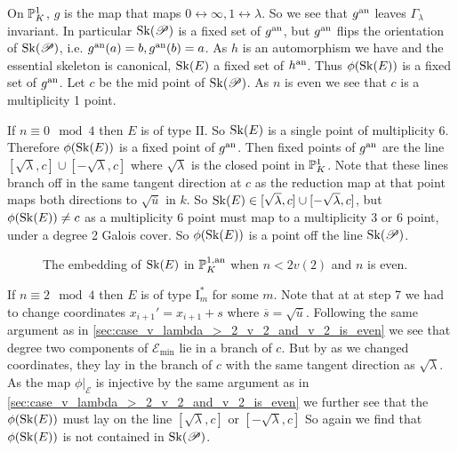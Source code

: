 On $\mathbb{P}^{1}_K$, $g$ is the map that maps $0 \leftrightarrow \infty, 1 \leftrightarrow \lambda$. 
So we see that $g{}^{\text{an}}$ leaves $\Gamma_\lambda$ invariant. In particular $\operatorname{Sk}(\mathscr P)$ is a fixed set of $g{}^{\text{an}}$, but $g{}^{\text{an}}$ flips the orientation of $\operatorname{Sk}(\mathscr P)$, i.e. $g{}^{\text{an}}(a) = b, g{}^{\text{an}}(b) = a$. 
As $h$ is an automorphism we have and the essential skeleton is canonical, $\operatorname{Sk}(E)$ a fixed set of $h{}^{\text{an}}$. 
Thus $\phi(\sk(E))$ is a fixed set of $g{}^{\text{an}}$.
Let $c$ be the mid point of $\operatorname{Sk}(\mathscr P)$. 
As $n$ is even we see that $c$ is a multiplicity 1 point. 

\medskip

If  $n \equiv 0 \mod 4$ then $E$ is of type $\mathrm{II}$.  
So $\operatorname{Sk}(E)$ is a single point of multiplicity 6. 
Therefore  $\phi(\sk(E))$ is a fixed point of $g{}^{\text{an}}$. 
Then fixed points of $g{}^{\text{an}}$ are the line  $[\sqrt{\lambda}, c] \cup [-\sqrt{\lambda} , c]$ where $\sqrt{\lambda} $ is the closed point in $\mathbb{P}^{1}_K$. 
Note that these lines branch off in the same tangent direction at $c$ as the reduction map at that point maps both directions to  $\sqrt{\overline{u}} $ in $k$. 
So $\operatorname{Sk}(E) \in [\sqrt{\lambda}, c] \cup [-\sqrt{\lambda}, c] $, but $\phi(\sk(E)) \ne c$ as a multiplicity 6 point must map to a multiplicity 3 or 6 point, under a degree 2 Galois cover. 
So $\phi(\sk(E))$ is a point off the line $\operatorname{Sk}(\mathscr P)$. 

\begin{figure}[h]
    \centering
    \caption{The embedding of $\operatorname{Sk}(E)$ in $\mathbb{P}^{1, \text{an}}_K$ when $n < 2v(2)$ and  $n$ is even.}
    \label{fig:image-skeleton-wild-n-le-2v2-n-even}
\end{figure}
\medskip 
If $n \equiv 2 \mod 4$ then $E$ is of type $\mathrm I_{m}^*$ for some $m$. 
Note that at at step 7 we had to change coordinates $x_{i+1}' = x_{i + 1}  + s$ where $\overline{s} = \sqrt{\overline{u}} $. 
Following the same argument as in \cref{sec:case_v_lambda_>_2_v_2_and_v_2_is_even} we see that degree two components of $\mathscr E_\text{min} $ lie in a branch of $c$. 
But by as we changed coordinates, they lay in the branch of $c$ with the same tangent direction as $\sqrt{\lambda} $. 
As the map $\phi|_{\mathscr E}$ is injective by the same argument as in \cref{sec:case_v_lambda_>_2_v_2_and_v_2_is_even} we further see that the $\phi(\sk(E))$ must lay on the line $[\sqrt{\lambda}, c] $ or $[-\sqrt{\lambda} , c]$
So again we find that $\phi(\sk (E))$ is not contained in $\operatorname{Sk}(\mathscr P)$. 


